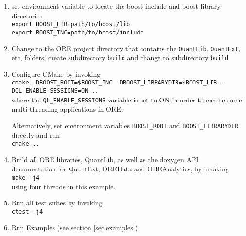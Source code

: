 \begin{enumerate}
\item set environment variable to locate the boost include and boost library directories\\
\medskip
  {\tt export BOOST\_LIB=path/to/boost/lib}\\
  {\tt export BOOST\_INC=path/to/boost/include}
\medskip
\item Change to the ORE project directory that contains the {\tt QuantLib}, {\tt QuantExt}, etc, folders; create subdirectory {\tt build} and change to subdirectory {\tt build}
\item Configure CMake by invoking \\
\medskip
{\tt cmake -DBOOST\_ROOT=\${BOOST\_INC} -DBOOST\_LIBRARYDIR=\${BOOST\_LIB} -DQL\_ENABLE\_SESSIONS=ON ..} \\
\medskip
where the {\tt QL\_ENABLE\_SESSIONS} variable is set to ON in order to enable some multi-threading applications in ORE.

Alternatively, set environment variables {\tt BOOST\_ROOT} and {\tt BOOST\_LIBRARYDIR} directly and run \\
\medskip
{\tt cmake ..} \\
\medskip
\item Build all ORE libraries, QuantLib, as well as the doxygen API documentation for QuantExt, OREData and OREAnalytics, by invoking \\
\medskip
{\tt make -j4} \\
\medskip
using four threads in this example.
\medskip
\item Run all test suites by invoking \\
\medskip
{\tt ctest -j4}
\item Run Examples (see section \ref{sec:examples})
\end{enumerate}


